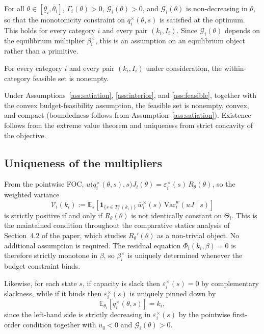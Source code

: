 \documentclass[master.tex]{subfiles}
\begin{document}
\begin{assumption}\label{ass:interior}
For all $\theta\in\left[\underline{\theta}_i,\overline{\theta}_i\right]$, $\Gamma_i(\theta)>0$, $\mathcal G_i(\theta)>0$, and $\mathcal G_i(\theta)$ is non-decreasing in $\theta$, so that the monotonicity constraint on $q_i^\times(\theta,s)$ is satisfied at the optimum. This holds for every category $i$ and every pair $(k_i,I_i)$. Since $\mathcal G_i(\theta)$ depends on the equilibrium multiplier $\beta_i^\times$, this is an assumption on an equilibrium object rather than a primitive.
\end{assumption}

\begin{assumption}[Feasibility]\label{ass:feasible}
For every category $i$ and every pair $(k_i,I_i)$ under consideration, the within-category feasible set is nonempty.
\end{assumption}

Under Assumptions~\ref{ass:satiation}, \ref{ass:interior}, and \ref{ass:feasible}, together with the convex budget-feasibility assumption, the feasible set is nonempty, convex, and compact (boundedness follows from Assumption~\ref{ass:satiation}). Existence follows from the extreme value theorem and uniqueness from strict concavity of the objective.

\subsection{Uniqueness of the multipliers}

From the pointwise FOC, $u\bigl(q_i^\times(\theta,s),s\bigr)J_i(\theta) = \varepsilon_i^\times(s)\,R_\theta(\theta)$, so the weighted variance
\[
\mathcal V_i(k_i)
:=
\mathbb E_s\!\left[
\mathbf 1_{\{s\in T_i^\times(k_i)\}}
\,\bar w_i^\times(s)\,
\mathrm{Var}_i^w(uJ\mid s)
\right]
\]
is strictly positive if and only if $R_\theta(\theta)$ is not identically constant on $\Theta_i$. This is the maintained condition throughout the comparative statics analysis of Section~4.2 of the paper, which studies $R_\theta'(\theta)$ as a non-trivial object. No additional assumption is required. The residual equation $\Phi_i(k_i,\beta)=0$ is therefore strictly monotone in $\beta$, so $\beta_i^\times$ is uniquely determined whenever the budget constraint binds.

Likewise, for each state $s$, if capacity is slack then
$\varepsilon_i^\times(s)=0$ by complementary slackness, while if it
binds then $\varepsilon_i^\times(s)$ is uniquely pinned down by
\[
\mathbb E_{\theta_i}\!\left[q_i^\times(\theta,s)\right]=k_i,
\]
since the left-hand side is strictly decreasing in
$\varepsilon_i^\times(s)$ by the pointwise first-order condition
together with $u_q<0$ and $\mathcal G_i(\theta)>0$.
\end{document}
